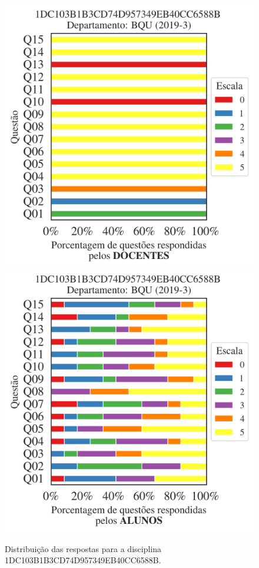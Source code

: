 \documentclass[a4paper,10pt]{article}
\begin{document}
\begin{figure}[h]
\centering
\includegraphics[width=0.485\linewidth]{analise_disciplina_departamento_BQU_1DC103B1B3CD74D957349EB40CC6588B_docentes.png}
\includegraphics[width=0.485\linewidth]{analise_disciplina_departamento_BQU_1DC103B1B3CD74D957349EB40CC6588B_alunos.png}
\caption{\label{fig:analise_geral_departamento}                Distribuição das respostas para a disciplina 1DC103B1B3CD74D957349EB40CC6588B. }
\end{figure}
\end{document}
